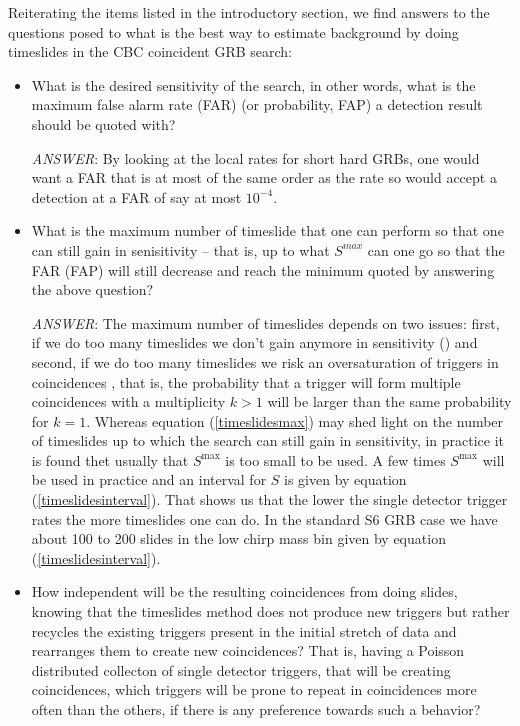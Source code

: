 \documentclass[epsf]{article}
\begin{document}
Reiterating the items listed in the introductory section, we find answers to the questions posed to what is the best way to estimate background by doing timeslides in the CBC coincident GRB search:
\begin{itemize}
\item
What is the desired sensitivity of the search, in other words, what is the maximum false alarm rate (FAR) (or probability, FAP) a detection result should be quoted with?

\emph{ANSWER}: By looking at the local rates for short hard GRBs, one would want a FAR that is at most of the same order as the rate so would accept a detection at a FAR of say at most $10^{-4}$.

\item
What is the maximum number of timeslide that one can perform so that one can still gain in senisitivity -- that is, up to what $S^{max}$ can one go so that the FAR (FAP) will still decrease and reach the minimum quoted by answering the above question?

\emph{ANSWER}: The maximum number of timeslides depends on two issues: first, if we do too many timeslides we don't gain anymore in sensitivity (\cite{was}) and second, if we do too many timeslides we risk an oversaturation of triggers in coincidences , that is, the probability that a trigger will form multiple coincidences with a multiplicity $k>1$ will be larger than the same probability for $k=1$. Whereas equation (\ref{timeslidesmax}) may shed light on the number of timeslides up to which the search can still gain in sensitivity, in practice it is found thet usually that $S^{\mathrm{max}}$ is too small to be used. A few times  $S^{\mathrm{max}}$ will be used in practice and an interval for $S$ is given by equation (\ref{timeslidesinterval}). That shows us that the lower the single detector trigger rates the more timeslides one can do. In the standard S6 GRB case we have about 100 to 200 slides in the low chirp mass bin given by equation (\ref{timeslidesinterval}).

\item
How independent will be the resulting coincidences from doing slides, knowing that the timeslides method does not produce new triggers but rather recycles the existing triggers present in the initial stretch of data and rearranges them to create new coincidences? That is, having a Poisson distributed collecton of single detector triggers, that will be creating coincidences, which triggers will be prone to repeat in coincidences more often than the others, if there is any preference towards such a behavior?


\end{itemize}
\end{document}
